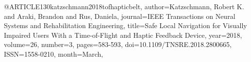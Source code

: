 @ARTICLE{130katzschmann2018tofhapticbelt,
author={Katzschmann, Robert K. and Araki, Brandon and Rus, Daniela},
journal={IEEE Transactions on Neural Systems and Rehabilitation Engineering}, 
title={Safe Local Navigation for Visually Impaired Users With a Time-of-Flight and Haptic Feedback Device}, 
year={2018},
volume={26},
number={3},
pages={583-593},
doi={10.1109/TNSRE.2018.2800665},
ISSN={1558-0210},
month={March},}